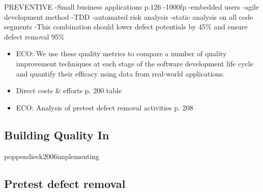 PREVENTIVE
-Small business applications p.126
	-1000fp
	-embedded users
	-agile development method
	-TDD
	-automated risk analysis
	-static analysis on all code segments
	-This combination should lower defect potentials by 45\% and ensure defect removal 95\%




 \begin{itemize}
  
 \item ECO: We use these quality metrics to compare a number of quality improvement techniques at each stage of the software development life cycle and quantify their efficacy using data from real-world applications.
 
 \item Direct costs \& efforts p. 200 table

 \item ECO: Analysis of pretest defect removal activities p. 208

 \end{itemize}
 
 \subsection{Building Quality In}




{poppendieck2006implementing} 

 \subsection{Pretest defect removal}
 
